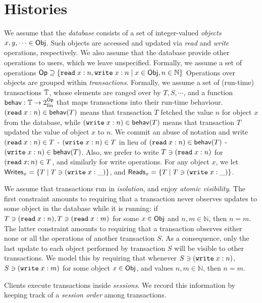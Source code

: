 \documentclass[a4paper,UKenglish]{article}%
\theoremstyle{plain}
\begin{document}
\section{Histories}
We assume that the \emph{database} consists of a set of 
integer-valued \emph{objects} $x, y, \cdots \in \mathsf{Obj}$. 
Such objects are accessed and updated via \emph{read} and 
\emph{write} operations, respectively. We also assume that 
the database provide other operations to users, which we leave unspecified. Formally, we assume a 
set of operations $\mathsf{Op} \supseteq \{{{\tt read}}\;x: n, {{\tt write}}\; x: n \mid x \in \mathsf{Obj}, n \in \mathbb{N} \}$
Operations over objects are grouped within \emph{transactions}. Formally, 
we assume a set of (run-time) transactions $\mathbb{T}$, whose elements are ranged over by 
$T,S, \cdots$, and a function $\mathsf{behav}: \mathbb{T} \rightarrow 2^{\mathsf{Op}}_{\text{fin}}$ 
that maps transactions into their run-time behaviour. $({{\tt read}}\;x: n) \in \mathsf{behav}(T)$ 
means that transaction $T$ fetched the value $n$ for object $x$ from the database, 
while $({{\tt write}}\;x:n) \in \mathsf{behav}(T)$ means that transaction $T$ updated the value 
of object $x$ to $n$. We commit an abuse of notation and write 
$({{\tt read}}\;x:n) \in T$ - $({{\tt write}}\;x:n) \in T$ in lieu of $({{\tt read}}\;x:n) \in \mathsf{behav}(T)$ 
- $({{\tt write}}\;x:n) \in \mathsf{behav}(T)$. Also, we prefer to write 
$T \ni ({{\tt read}}\;x:n)$ for $({{\tt read}}\;x;n) \in T$, and similarly for write operations.
For any object $x$, we let ${\sf{Writes}}_x = \{ T \mid T \ni ({{\tt write}}\;x:\_)\}$, 
and ${\sf{Reads}}_x = \{T \mid T \ni ({{\tt write}}\;x:\_)\}$.

We assume that transactions run in \emph{isolation}, and enjoy 
\emph{atomic visibility}. The first constraint amounts to requiring that a transaction 
never observes updates to some object in the database while it is running: 
if $T \ni ({{\tt read}}\;x:n), T \ni ({{\tt read}}\;x:m)$ for some $x \in \mathsf{Obj}$ 
and $n,m \in \mathbb{N}$, then $n = m$. 
The latter constraint amounts to requiring that a transaction observes either 
none or all the operations of another transaction $S$. As a consequence, 
only the last update to each object performed by transaction $S$ will be 
visible to other transactions. We model this by requiring that whenever 
$S \ni ({{\tt write}}\;x:n)$, $ S \ni ({{\tt write}}\;x:m)$ for some object 
$x \in \mathsf{Obj}$, and values $n,m \in \mathbb{N}$, then $n = m$. 


Clients execute transactions inside \emph{sessions}. We record 
this information by keeping track of a \emph{session order} among 
transactions. 
\end{document}
